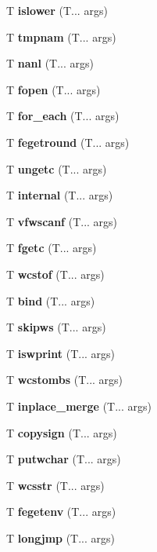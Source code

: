 \begin{DoxyCompactItemize}
\mbox{\label{islower}} 
T \textbf{ islower} (T... args)
\item 
\mbox{\label{tmpnam}} 
T \textbf{ tmpnam} (T... args)
\item 
\mbox{\label{nan}} 
T \textbf{ nanl} (T... args)
\item 
\mbox{\label{fopen}} 
T \textbf{ fopen} (T... args)
\item 
\mbox{\label{for_each}} 
T \textbf{ for\+\_\+each} (T... args)
\item 
\mbox{\label{feround}} 
T \textbf{ fegetround} (T... args)
\item 
\mbox{\label{ungetc}} 
T \textbf{ ungetc} (T... args)
\item 
\mbox{\label{left}} 
T \textbf{ internal} (T... args)
\item 
\mbox{\label{vfwscanf}} 
T \textbf{ vfwscanf} (T... args)
\item 
\mbox{\label{fgetc}} 
T \textbf{ fgetc} (T... args)
\item 
\mbox{\label{wcstof}} 
T \textbf{ wcstof} (T... args)
\item 
\mbox{\label{bind}} 
T \textbf{ bind} (T... args)
\item 
\mbox{\label{skipws}} 
T \textbf{ skipws} (T... args)
\item 
\mbox{\label{iswprint}} 
T \textbf{ iswprint} (T... args)
\item 
\mbox{\label{wcstombs}} 
T \textbf{ wcstombs} (T... args)
\item 
\mbox{\label{inplace_merge}} 
T \textbf{ inplace\+\_\+merge} (T... args)
\item 
\mbox{\label{copysign}} 
T \textbf{ copysign} (T... args)
\item 
\mbox{\label{putwchar}} 
T \textbf{ putwchar} (T... args)
\item 
\mbox{\label{wcsstr}} 
T \textbf{ wcsstr} (T... args)
\item 
\mbox{\label{feenv}} 
T \textbf{ fegetenv} (T... args)
\item 
\mbox{\label{longjmp}} 
T \textbf{ longjmp} (T... args)
\item 
\mbox{\label{iswcntrl}} 

\end{DoxyCompactItemize}
